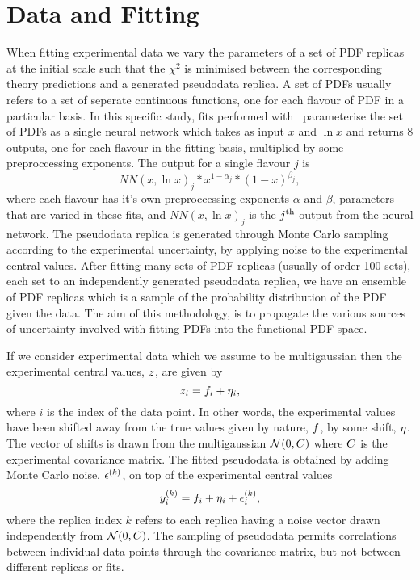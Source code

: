 \section{Data and Fitting}

When fitting experimental data we vary the parameters of a set of PDF replicas
at the initial scale such that the $\chi^2$ is minimised between the
corresponding theory predictions and a generated pseudodata replica. A set of
PDFs usually refers to a set of seperate continuous functions, one for each
flavour of PDF in a particular basis. In this specific study, fits performed
with \nfit\ parameterise the set of PDFs as a single neural network which takes
as input $x$ and $\ln x$ and returns 8 outputs, one for each flavour in the
fitting basis, multiplied by some preproccessing exponents. The output for a
single flavour $j$ is
\begin{equation}
    NN(x, \ln x)_j * x^{1-\alpha_j} * (1-x)^{\beta_j},
\end{equation}
where each flavour has it's own preproccessing exponents $\alpha$ and $\beta$,
parameters that are varied in these fits, and $NN(x, \ln x)_j$ is the
$j^{\rm th}$ output from the neural network. The pseudodata replica is generated
through Monte Carlo sampling according to the experimental uncertainty, by
applying noise to the experimental
central values. After fitting many sets of PDF replicas (usually of order 100 sets),
each set to an independently generated pseudodata replica, we have an ensemble of
PDF replicas which is a sample of the probability distribution of the PDF given
the data. The aim of this methodology, is to propagate the various sources of
uncertainty involved with fitting PDFs into the functional PDF space.

If we consider experimental data which we assume
to be multigaussian then the experimental central values, $z$, are given by
\begin{equation}
    z_{i} = f_i + \eta_i,
\end{equation}
where $i$ is the index of the data point.
In other words, the experimental values have been shifted away from the true
values given by nature, $f$, by some shift, $\eta$. The vector of shifts
is drawn from
the multigaussian $\mathcal{N}(0, C)$ where $C$ is the experimental
covariance matrix. The fitted pseudodata is obtained by adding Monte Carlo
noise, $\epsilon^{(k)}$, on top of the experimental central values
\begin{equation}
    y^{(k)}_{i} = f_i + \eta_i + \epsilon^{(k)}_{i},
\end{equation}
where the replica index $k$ refers to each replica having a noise vector drawn
independently from $\mathcal{N}(0, C)$. The sampling of pseudodata permits
correlations between individual data points through the covariance matrix,
but not between different replicas or fits.

